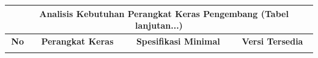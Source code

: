 \begin{enumerate}
{\begin{longtable}{clll}
		      \multicolumn{4}{c}{\small\tablename\ \thetable\ {Analisis Kebutuhan Perangkat Keras Pengembang} \space (Tabel lanjutan...)}                                                                                                                                                                     \\

		      \hline
		      \textbf{No} & \multicolumn{1}{c}{\textbf{Perangkat Keras}} & \multicolumn{1}{c}{\textbf{Spesifikasi Minimal}}                                                     & \multicolumn{1}{c}{\textbf{Versi Tersedia}}                                                                                 \\ \hline
		      \endhead
		      \hline
		      \endfoot
		      \endlastfoot


\end{longtable}}
\end{enumerate}
